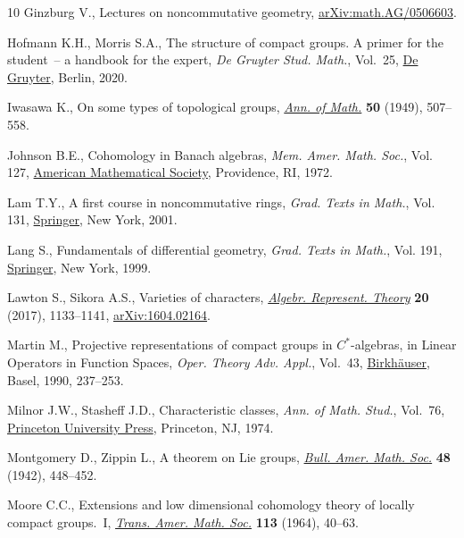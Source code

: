 \documentclass[10pt,a4paper]{amsart}
\numberwithin{equation}{section}
\begin{document}
\begin{thebibliography}{10}
Ginzburg V., Lectures on noncommutative geometry, \href{https://arxiv.org/abs/math.AG/0506603}{arXiv:math.AG/0506603}.

Hofmann K.H., Morris S.A., The structure of compact groups. {A} primer for the
 student~-- a handbook for the expert, \textit{De Gruyter Stud. Math.},
 Vol.~25, \href{https://doi.org/10.1515/9783110695991}{De Gruyter}, Berlin, 2020.

Iwasawa K., On some types of topological groups, \href{https://doi.org/10.2307/1969548}{\textit{Ann. of Math.}}
 \textbf{50} (1949), 507--558.

Johnson B.E., Cohomology in {B}anach algebras, \textit{Mem. Amer. Math. Soc.},
 Vol. 127, \href{https://doi.org/10.1090/memo/0127}{American Mathematical Society}, Providence, RI, 1972.

Lam T.Y., A first course in noncommutative rings, \textit{Grad. Texts in
 Math.}, Vol. 131, \href{https://doi.org/10.1007/978-1-4419-8616-0}{Springer}, New York, 2001.

Lang S., Fundamentals of differential geometry, \textit{Grad. Texts in Math.},
 Vol. 191, \href{https://doi.org/10.1007/978-1-4612-0541-8}{Springer}, New York, 1999.

Lawton S., Sikora A.S., Varieties of characters, \href{https://doi.org/10.1007/s10468-017-9679-y}{\textit{Algebr. Represent.
 Theory}} \textbf{20} (2017), 1133--1141, \href{https://arxiv.org/abs/1604.02164}{arXiv:1604.02164}.

Martin M., Projective representations of compact groups in {$C^*$}-algebras, in
 Linear {O}perators in {F}unction {S}paces, \textit{Oper. Theory Adv. Appl.},
 Vol.~43, \href{https://doi.org/10.1007/978-3-0348-7250-8_17}{Birkh\"auser}, Basel, 1990, 237--253.

Milnor J.W., Stasheff J.D., Characteristic classes, \textit{Ann. of Math.
 Stud.}, Vol.~76, \href{https://doi.org/10.1515/9781400881826}{Princeton University Press}, Princeton, NJ, 1974.

Montgomery D., Zippin L., A theorem on {L}ie groups, \href{https://doi.org/10.1090/S0002-9904-1942-07699-3}{\textit{Bull. Amer. Math.
 Soc.}} \textbf{48} (1942), 448--452.

Moore C.C., Extensions and low dimensional cohomology theory of locally compact
 groups.~{I}, \href{https://doi.org/10.2307/1994090}{\textit{Trans. Amer. Math. Soc.}} \textbf{113} (1964), 40--63.


\end{thebibliography}
\end{document}
